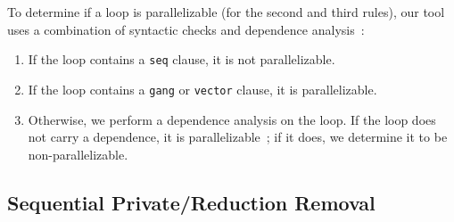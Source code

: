 \documentclass{sig-alternate-05-2015}
\newcommand{\squish}{
     { \setlength{\itemsep}{0pt}      \setlength{\parsep}{3pt}
       \setlength{\topsep}{3pt}       \setlength{\partopsep}{0pt}
       \setlength{\leftmargin}{1.5em} \setlength{\labelwidth}{1em}
       \setlength{\labelsep}{0.5em} } }
\begin{document}
To determine if a loop is parallelizable (for the second and third rules), our
tool uses a combination of syntactic checks and dependence
analysis~\cite{wolfe,kennedy}:
\begin{enumerate}\squish
\item If the loop contains a \texttt{seq} clause, it is not parallelizable.
\item If the loop contains a \texttt{gang} or \texttt{vector} clause, it is
parallelizable.
\item Otherwise, we perform a dependence analysis on the loop.  If the loop
does not carry a dependence, it is parallelizable~\cite{kennedy}; if it
does, we determine it to be non-parallelizable.
\end{enumerate}

\subsection{Sequential Private/Reduction Removal}
\label{sec:privred}
\end{document}
